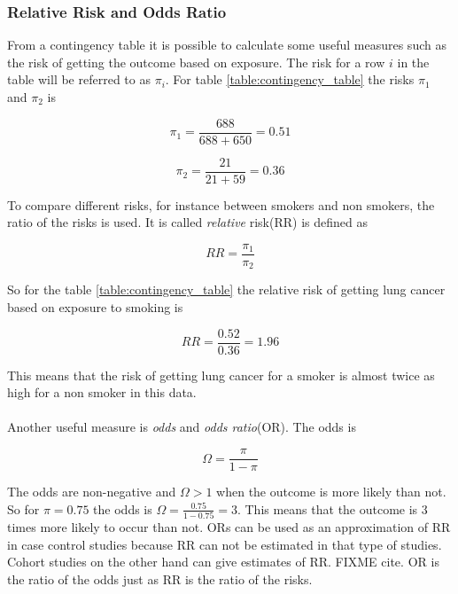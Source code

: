 \documentclass[10pt,a4paper]{report}
\begin{document}
\subsubsection{Relative Risk and Odds Ratio}
\label{rr_or}
From a contingency table it is possible to calculate some useful measures such as the risk of getting the outcome based on exposure. The risk for a row $i$ in the table will be referred to as $\pi_i$. For table \ref{table:contingency_table} the risks $\pi_1$ and $\pi_2$ is

\begin{equation}
\pi_1=\frac{688}{688+650}=0.51
\end{equation}

\begin{equation}
\pi_2=\frac{21}{21+59}=0.36
\end{equation}

To compare different risks, for instance between smokers and non smokers, the ratio of the risks is used\cite{agresti_categorical}. It is called \emph{relative} risk(RR) is defined as\cite{agresti_categorical} 

\begin{equation}
RR=\frac{\pi_1}{\pi_2}
\end{equation}

So for the table \ref{table:contingency_table} the relative risk of getting lung cancer based on exposure to smoking is

\begin{equation}
RR=\frac{0.52}{0.36}=1.96
\end{equation}

This means that the risk of getting lung cancer for a smoker is almost twice as high for a non smoker in this data.\\
\\
Another useful measure is \emph{odds} and \emph{odds ratio}(OR). The odds is\cite{agresti_categorical} 

\begin{equation}\label{eq:odds}
\Omega=\frac{\pi}{1-\pi}
\end{equation}

The odds are non-negative and $\Omega>1$ when the outcome is more likely than not\cite{agresti_categorical}. So for $\pi=0.75$ the odds is $\Omega=\frac{0.75}{1-0.75}=3$. This means that the outcome is 3 times more likely to occur than not. ORs can be used as an approximation of RR in case control studies because RR can not be estimated in that type of studies\cite{or_mislead}. Cohort studies on the other hand can give estimates of RR. FIXME cite\cite{}. OR is the ratio of the odds just as RR is the ratio of the risks\cite{agresti_categorical}.
\end{document}
